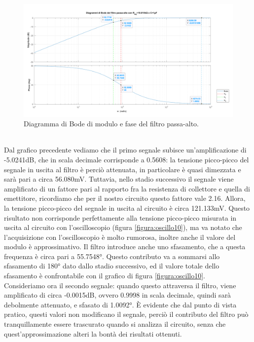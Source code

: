 \documentclass{report}
\begin{document}
\begin{figure}[h]
\centering
\includegraphics[width=\textwidth]{immagini/graficoCEv3}
\caption{Diagramma di Bode di modulo e fase del filtro passa-alto.}
\label{figura:grafico2}
\end{figure}
\\Dal grafico precedente vediamo che il primo segnale subisce un'amplificazione di -5.0241dB, che in scala decimale corrisponde a 0.5608: la tensione picco-picco del segnale in uscita al filtro è perciò attenuata, in particolare è quasi dimezzata e sarà pari a circa 56.080mV. Tuttavia, nello stadio successivo il segnale viene amplificato di un fattore pari al rapporto fra la resistenza di collettore e quella di emettitore, ricordiamo che per il nostro circuito questo fattore vale 2.16. Allora, la tensione picco-picco del segnale in uscita al circuito è circa 121.133mV. Questo risultato non corrisponde perfettamente alla tensione picco-picco misurata in uscita al circuito con l'oscilloscopio (figura \ref{figura:oscillo10}), ma va notato che l'acquisizione con l'oscilloscopio è molto rumorosa, inoltre anche il valore del modulo è approssimativo. Il filtro introduce anche uno sfasamento, che a questa frequenza è circa pari a 55.7548°. Questo contributo va a sommarsi allo sfasamento di 180° dato dallo stadio successivo, ed il valore totale dello sfasamento è confrontabile con il grafico di figura \ref{figura:oscillo10}.
\\\indent Consideriamo ora il secondo segnale: quando questo attraversa il filtro, viene amplificato di circa -0.0015dB, ovvero 0.9998 in scala decimale, quindi sarà debolmente attenuato, e sfasato di 1.0092°. È evidente che dal punto di vista pratico, questi valori non modificano il segnale, perciò il contributo del filtro può tranquillamente essere trascurato quando si analizza il circuito, senza che quest'approssimazione alteri la bontà dei risultati ottenuti.  
\clearpage
\newpage
\end{document}
